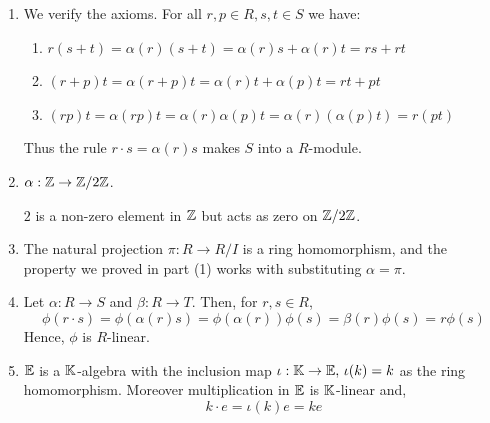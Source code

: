 \documentclass[Notebook.tex]{subfiles}
\begin{document}
\begin{solution}
    \bbni

    \begin{enumerate}
        \item We verify the axioms. For all $r, p \in R, s, t \in S$ we have: 
        \begin{enumerate}
            \item $r(s + t) = \alpha(r) (s+t) = \alpha(r) s + \alpha(r)t = rs + rt$
            \item $(r + p) t = \alpha(r + p) t = \alpha(r) t + \alpha(p)t = rt + pt$
            \item $(rp)t = \alpha(rp) t = \alpha(r) \alpha(p) t =\alpha(r) (\alpha(p) t) = r(pt)$
        \end{enumerate}
        Thus the rule $r \cdot s = \alpha(r) s$ makes $S$ into a $R$-module. 
        
        \item $\alpha: \mathbb Z \to \mathbb Z/2\mathbb Z$. 
        
        $2$ is a non-zero element in $\mathbb Z$ but acts as zero on $\mathbb Z/2\mathbb Z$.

        \item The natural projection $\pi: R \to R/I$ is a ring homomorphism, and the property we proved in part (1) works with substituting $\alpha = \pi$. 
        
        \item Let $\alpha: R \to S$ and $\beta: R \to T$. Then, for $r, s \in R$, 
        \[\phi(r \cdot s) = \phi(\alpha(r)s) = \phi(\alpha(r))\phi(s) = \beta(r)\phi(s)  =r \phi(s)\]
        Hence, $\phi$ is $R$-linear. 

        \item $\mathbb E$ is a $\mathbb K$-algebra with the inclusion map $\iota: \mathbb K \to \mathbb E, \, \iota(k) = k$ as the ring homomorphism. Moreover multiplication in $\mathbb E$ is $\mathbb K$-linear and, 
        \[k \cdot e = \iota(k)e = k e\]
    \end{enumerate}
\end{solution}

\newpage
\end{document}
